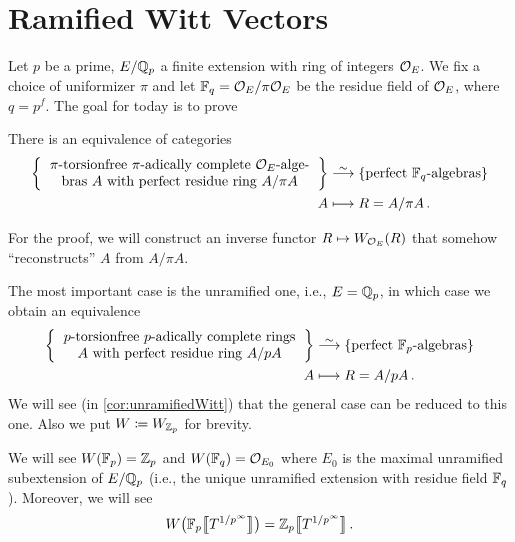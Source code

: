 \documentclass[a4paper, 10pt, oneside, DIV=9, chapterprefix=true, numbers=enddot,bibliography=totoc]{scrbook}
\begin{document}
\section{Ramified Witt Vectors}
Let $p$ be a prime, $E/\mathbb{Q}_p$ a finite extension with ring of integers $\mathcal{O}_E$. We fix a choice of uniformizer $\pi$ and let $\mathbb{F}_q=\mathcal{O}_E/\pi\mathcal{O}_E$ be the residue field of $\mathcal{O}_E$, where $q=p^f$. The goal for today is to prove
\begin{prop}\label{prop:FqAlgebrasEquivalence}
	There is an equivalence of categories
	\begin{align*}
		\left\{\begin{tabular}{c}
			$\pi$-torsionfree $\pi$-adically complete $\Oo_E$-alge-\\
			bras $A$ with perfect residue ring $A/\pi A$
		\end{tabular}
		\right\}&\isomorphism\left\{\text{perfect $\IF_q$-algebras}\right\}\\
		A&\longmapsto R=A/\pi A\,.
	\end{align*}
\end{prop}
For the proof, we will construct an inverse functor $R\mapsto W_{\mathcal{O}_E}(R)$ that somehow \enquote{reconstructs} $A$ from $A/\pi A$.
\begin{rem}
	The most important case is the unramified one, i.e., $E=\mathbb{Q}_p$, in which case we obtain an equivalence
	\begin{align*}
	\left\{\begin{tabular}{c}
	$p$-torsionfree $p$-adically complete rings\\
	$A$ with perfect residue ring $A/pA$
	\end{tabular}
	\right\}&\isomorphism\left\{\text{perfect $\IF_p$-algebras}\right\}\\
	A&\longmapsto R=A/p A\,.
	\end{align*}
	We will see (in \cref{cor:unramifiedWitt}) that the general case can be reduced to this one. Also we put $W\coloneqq W_{\mathbb{Z}_p}$ for brevity.
\end{rem}
We will see $W(\mathbb{F}_p)=\mathbb{Z}_p$ and $W(\mathbb{F}_q)=\mathcal{O}_{E_0}$ where $E_0$ is the maximal unramified subextension of $E/\mathbb{Q}_p$ (i.e., the unique unramified extension with residue field $\mathbb{F}_q$). Moreover, we will see
	\begin{equation*}
		W\big(\mathbb{F}_p\big\llbracket T^{1/p^\infty}\big\rrbracket\big)=\mathbb{Z}_p\big\llbracket T^{1/p^\infty}\big\rrbracket\,.
	\end{equation*}
	
\end{document}
